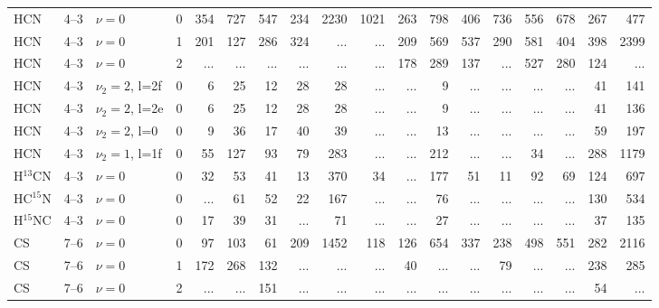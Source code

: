 \begin{table}
\begin{threeparttable}
\begin{tabular}{lclcrrrrrrrrrrrrrr}
HCN            & 4--3                     & $\nu=0$         & 0 &  354 &  727 &  547 &  234 & 2230 & 1021 &  263 &  798 &  406 &  736 &  556 &  678 &  267 &  477 \\
HCN            & 4--3                     & $\nu=0$         & 1 &  201 &  127 &  286 &  324 &  ... &  ... &  209 &  569 &  537 &  290 &  581 &  404 &  398 & 2399 \\
HCN            & 4--3                     & $\nu=0$         & 2 &  ... &  ... &  ... &  ... &  ... &  ... &  178 &  289 &  137 &  ... &  527 &  280 &  124 &  ... \\
HCN            & 4--3                     & $\nu_2=2$, l=2f & 0 &    6 &   25 &   12 &   28 &   28 &  ... &  ... &    9 &  ... &  ... &  ... &  ... &   41 &  141 \\
HCN            & 4--3                     & $\nu_2=2$, l=2e & 0 &    6 &   25 &   12 &   28 &   28 &  ... &  ... &    9 &  ... &  ... &  ... &  ... &   41 &  136 \\
HCN            & 4--3                     & $\nu_2=2$, l=0  & 0 &    9 &   36 &   17 &   40 &   39 &  ... &  ... &   13 &  ... &  ... &  ... &  ... &   59 &  197 \\
HCN            & 4--3                     & $\nu_2=1$, l=1f & 0 &   55 &  127 &   93 &   79 &  283 &  ... &  ... &  212 &  ... &  ... &   34 &  ... &  288 & 1179 \\
H$^{13}$CN     & 4--3                     & $\nu=0$         & 0 &   32 &   53 &   41 &   13 &  370 &   34 &  ... &  177 &   51 &   11 &   92 &   69 &  124 &  697 \\
HC$^{15}$N     & 4--3                     & $\nu=0$         & 0 &  ... &   61 &   52 &   22 &  167 &  ... &  ... &   76 &  ... &  ... &  ... &  ... &  130 &  534 \\
H$^{15}$NC     & 4--3                     & $\nu=0$         & 0 &   17 &   39 &   31 &  ... &   71 &  ... &  ... &   27 &  ... &  ... &  ... &  ... &   37 &  135 \\
CS             & 7--6                     & $\nu=0$         & 0 &   97 &  103 &   61 &  209 & 1452 &  118 &  126 &  654 &  337 &  238 &  498 &  551 &  282 & 2116 \\
CS             & 7--6                     & $\nu=0$         & 1 &  172 &  268 &  132 &  ... &  ... &  ... &   40 &  ... &  ... &   79 &  ... &  ... &  238 &  285 \\
CS             & 7--6                     & $\nu=0$         & 2 &  ... &  ... &  151 &  ... &  ... &  ... &  ... &  ... &  ... &  ... &  ... &  ... &   54 &  ... \\

\end{tabular}
\end{threeparttable}
\end{table}
